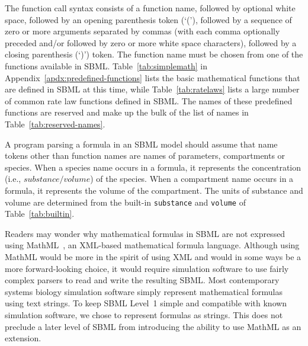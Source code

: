 \documentclass[10pt]{cekarticle}
\newcommand{\vref}[1]{\ref{#1}}
\newcommand{\changed}[1]{\textcolor{BrickRed}{#1}}
\begin{document}
The function call syntax consists of a function name, followed by optional
white space, followed by an opening parenthesis token (`('), followed by a
sequence of zero or more arguments separated by commas \changed{(with each
  comma optionally preceded and/or followed by zero or more white space
  characters)}, followed by a closing parenthesis (`)') token.  The
function name must be chosen from one of the functions available in SBML.
Table~\ref{tab:simplemath} in Appendix~\ref{apdx:predefined-functions}
lists the basic mathematical functions that are defined in SBML at this
time, while Table~\ref{tab:ratelaws} lists a large number of common rate
law functions defined in SBML.  The names of these predefined functions are
reserved and make up the bulk of the list of names in
Table~\vref{tab:reserved-names}.

A program parsing a formula in an SBML model should assume that name tokens
other than function names are names of \changed{parameters, compartments or
  species}.  When a \changed{species} name occurs in a formula, it
represents the concentration (i.e., $substance/volume$) of the
\changed{species}.  When a compartment name occurs in a formula, it
represents the volume of the compartment.  The units of substance and
volume are determined from the built-in \texttt{substance} and
\texttt{volume} of Table~\vref{tab:builtin}.

Readers may wonder why mathematical formulas in SBML are not expressed
using MathML~\citep{w3c:2000b}, an XML-based mathematical formula language.
Although using MathML would be more in the spirit of using XML and would in
some ways be a more forward-looking choice, it would require simulation
software to use fairly complex parsers to read and write the resulting
SBML.  Most contemporary systems biology simulation software simply
represent mathematical formulas using text strings.  To keep SBML Level~1
simple and compatible with known simulation software, we chose to represent
formulas as strings.  This does not preclude a later level of SBML from
introducing the ability to use MathML as an extension.

\end{document}
